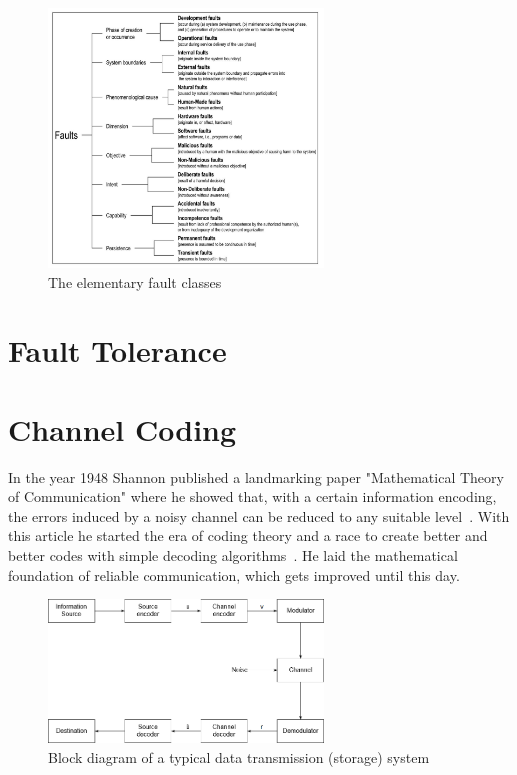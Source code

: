 \documentclass[]{myclass}
\begin{document}
\begin  {figure}  [H]
\centering
\includegraphics[width=0.65\textwidth]{figures/fault.png}
\caption{The elementary fault classes~\cite{art:Avizienis}}
\label{fig:fault}
\end {figure}

\section{Fault Tolerance}


\section{Channel Coding} \label{sec:cod}
In the year 1948 Shannon published a landmarking paper "Mathematical Theory of Communication" where he showed that, with a certain information encoding, the errors induced by a noisy channel can be reduced to any suitable level~\cite{art:Shannon}. With this article he started the era of coding theory and a race to create better and better codes with simple decoding algorithms~\cite{book:Lint}. He laid the mathematical foundation of reliable communication, which gets improved until this day.\\

\begin  {figure}  [H]
\centering
\includegraphics[width=0.65\textwidth]{figures/Data_transmission_path.png}
\caption{Block diagram of a typical data transmission (storage) system~\cite{book:LinCostello}}
\label{fig:data_path}
\end {figure}
\end{document}
